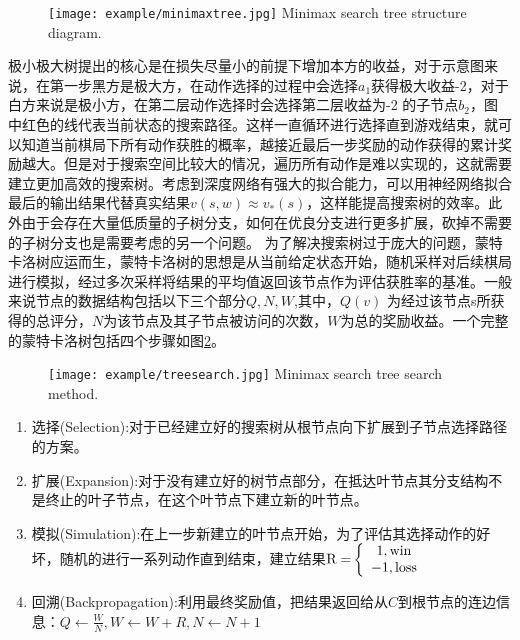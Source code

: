 \begin{figure}[htbp]
	\centering
	\texttt{[image: example/minimaxtree.jpg]}
	{Minimax search tree structure diagram.}
	\label{minimaxsearchtree}
\end{figure}
极小极大树提出的核心是在损失尽量小的前提下增加本方的收益，对于示意图来说，在第一步黑方是极大方，在动作选择的过程中会选择$a_1$获得极大收益-2，对于白方来说是极小方，在第二层动作选择时会选择第二层收益为-2 的子节点$b_2$，图中红色的线代表当前状态的搜索路径。这样一直循环进行选择直到游戏结束，就可以知道当前棋局下所有动作获胜的概率，越接近最后一步奖励的动作获得的累计奖励越大。但是对于搜索空间比较大的情况，遍历所有动作是难以实现的，这就需要建立更加高效的搜索树。考虑到深度网络有强大的拟合能力，可以用神经网络拟合最后的输出结果代替真实结果$v(s,w) \approx {v_*}(s)$，这样能提高搜索树的效率。此外由于会存在大量低质量的子树分支，如何在优良分支进行更多扩展，砍掉不需要的子树分支也是需要考虑的另一个问题。
为了解决搜索树过于庞大的问题，蒙特卡洛树应运而生，蒙特卡洛树的思想是从当前给定状态开始，随机采样对后续棋局进行模拟，经过多次采样将结果的平均值返回该节点作为评估获胜率的基准。一般来说节点的数据结构包括以下三个部分${Q,N,W}$,其中，$Q(v)$ 为经过该节点s所获得的总评分，$N$为该节点及其子节点被访问的次数，$W$为总的奖励收益。一个完整的蒙特卡洛树包括四个步骤如图\ref{fig:treesearch}。

\begin{figure}[htbp]
	\centering
	\texttt{[image: example/treesearch.jpg]}
	{Minimax search tree search method.}
	\label{fig:treesearch}
\end{figure}

\begin{enumerate}
	\item 选择(Selection):对于已经建立好的搜索树从根节点向下扩展到子节点选择路径的方案。
	\item 扩展(Expansion):对于没有建立好的树节点部分，在抵达叶节点其分支结构不是终止的叶子节点，在这个叶节点下建立新的叶节点。
	\item 模拟(Simulation):在上一步新建立的叶节点开始，为了评估其选择动作的好坏，随机的进行一系列动作直到结束，建立结果${\rm{R = }}\left\{ {\begin{array}{*{20}{c}}
		{{\rm{1,win}}}\\
		{{\rm{ - 1,loss}}}
		\end{array}} \right.$
	\item 回溯(Backpropagation):利用最终奖励值，把结果返回给从$C$到根节点的连边信息：$Q \leftarrow \frac{W}{N},W \leftarrow W + R,N \leftarrow N + 1$
\end{enumerate}

